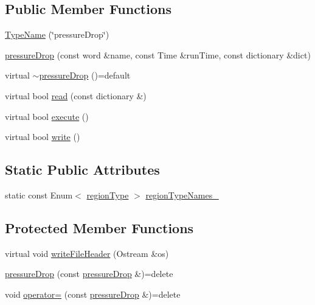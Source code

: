 \subsection*{Public Member Functions}
\begin{DoxyCompactItemize}
\item 
\hyperlink{classFoam_1_1functionObjects_1_1pressureDrop_a415f604491436afee44eb6a8b954838a}{Type\+Name} (\char`\"{}pressure\+Drop\char`\"{})
\item 
\hyperlink{classFoam_1_1functionObjects_1_1pressureDrop_ab4dba7cc45a3ea3514f85febe5e0dc1b}{pressure\+Drop} (const word \&name, const Time \&run\+Time, const dictionary \&dict)
\item 
virtual \hyperlink{classFoam_1_1functionObjects_1_1pressureDrop_a9413d2b0136de73c54e007c42aeecf56}{$\sim$pressure\+Drop} ()=default
\item 
virtual bool \hyperlink{classFoam_1_1functionObjects_1_1pressureDrop_afac0600fef97b05534a595ce00b272ed}{read} (const dictionary \&)
\item 
virtual bool \hyperlink{classFoam_1_1functionObjects_1_1pressureDrop_ae006844a02161d12182ab372ca5c257b}{execute} ()
\item 
virtual bool \hyperlink{classFoam_1_1functionObjects_1_1pressureDrop_ae8f6374e29a250261b3979bbd6e5cb40}{write} ()
\end{DoxyCompactItemize}
\subsection*{Static Public Attributes}
\begin{DoxyCompactItemize}
\item 
static const Enum$<$ \hyperlink{classFoam_1_1functionObjects_1_1pressureDrop_a2c25b4a3d851e2d45d7a435a73598323}{region\+Type} $>$ \hyperlink{classFoam_1_1functionObjects_1_1pressureDrop_aff2289f5bb0392c00aa73b59c58d2540}{region\+Type\+Names\+\_\+}
\end{DoxyCompactItemize}
\subsection*{Protected Member Functions}
\begin{DoxyCompactItemize}
\item 
virtual void \hyperlink{classFoam_1_1functionObjects_1_1pressureDrop_ad0c7a238f021a605e38a115efbb20aa3}{write\+File\+Header} (Ostream \&os)
\item 
\hyperlink{classFoam_1_1functionObjects_1_1pressureDrop_a5a2d6b1a9eb610b035c371ad6a6cb6fd}{pressure\+Drop} (const \hyperlink{classFoam_1_1functionObjects_1_1pressureDrop}{pressure\+Drop} \&)=delete
\item 
void \hyperlink{classFoam_1_1functionObjects_1_1pressureDrop_af045609cf3ac1bcc75de8bc8747f5350}{operator=} (const \hyperlink{classFoam_1_1functionObjects_1_1pressureDrop}{pressure\+Drop} \&)=delete
\end{DoxyCompactItemize}

